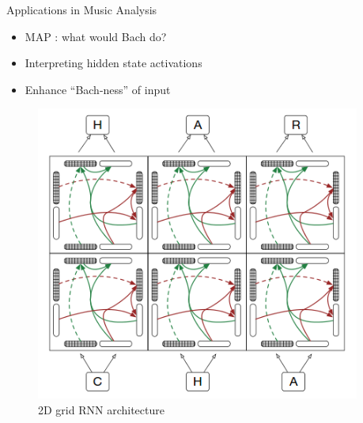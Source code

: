 \documentclass[final]{beamer}
\newlength{\onecolwid}
\newlength{\twocolwid}
\begin{document}
\begin{frame}[t]
\begin{columns}[t]
\begin{column}{\twocolwid}
\begin{columns}[t,totalwidth=\twocolwid]
\begin{column}{\onecolwid}

\end{column} %

\begin{column}{\onecolwid} %


\begin{block}{Applications in Music Analysis}
  \begin{itemize}
    \item MAP : what would Bach do?
    \item Interpreting hidden state activations
    \item Enhance ``Bach-ness'' of input
  \end{itemize}
\end{block}

\begin{figure}
  \includegraphics[width=0.95\linewidth]{Figures/grid-lstm.png}
  \caption{2D grid RNN architecture\cite{DBLP:journals/corr/KalchbrennerDG15}}
\end{figure}



\end{column}
\end{columns}
\end{column}
\end{columns}
\end{frame}
\end{document}
